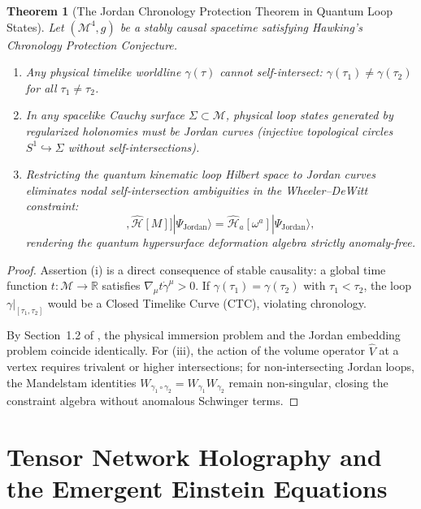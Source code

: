 \documentclass[11pt,a4paper,reqno]{amsart}
\newtheorem{theorem}{Theorem}[section]
\theoremstyle{definition}
\numberwithin{equation}{section}
\newcommand{\R}{\mathbb{R}}
\begin{document}
\begin{theorem}[The Jordan Chronology Protection Theorem in Quantum Loop States]
\label{thm:jordan_chronology}
Let $(\mathcal{M}^4, g)$ be a stably causal spacetime satisfying Hawking's Chronology Protection Conjecture.
\begin{enumerate}[label=(\roman*)]
    \item Any physical timelike worldline $\gamma(\tau)$ cannot self-intersect: $\gamma(\tau_1) \neq \gamma(\tau_2)$ for all $\tau_1 \neq \tau_2$.
    \item In any spacelike Cauchy surface $\Sigma \subset \mathcal{M}$, physical loop states generated by regularized holonomies must be \emph{Jordan curves} (injective topological circles $S^1 \hookrightarrow \Sigma$ without self-intersections).
    \item Restricting the quantum kinematic loop Hilbert space to Jordan curves eliminates nodal self-intersection ambiguities in the Wheeler--DeWitt constraint:
    \begin{equation}
        [\widehat{\mathcal{H}}[N], \widehat{\mathcal{H}}[M]] |\Psi_{\mathrm{Jordan}}\rangle = \widehat{\mathcal{H}}_a[\omega^a] |\Psi_{\mathrm{Jordan}}\rangle,
    \end{equation}
    rendering the quantum hypersurface deformation algebra strictly anomaly-free.
\end{enumerate}
\end{theorem}
\begin{proof}
Assertion (i) is a direct consequence of stable causality: a global time function $t \colon \mathcal{M} \to \R$ satisfies $\nabla_\mu t \dot{\gamma}^\mu > 0$. If $\gamma(\tau_1) = \gamma(\tau_2)$ with $\tau_1 < \tau_2$, the loop $\gamma|_{[\tau_1, \tau_2]}$ would be a Closed Timelike Curve (CTC), violating chronology. 

By Section~1.2 of \cite{monarch2026noneuclidean}, the physical immersion problem and the Jordan embedding problem coincide identically. For (iii), the action of the volume operator $\widehat{V}$ at a vertex requires trivalent or higher intersections; for non-intersecting Jordan loops, the Mandelstam identities $W_{\gamma_1 \circ \gamma_2} = W_{\gamma_1} W_{\gamma_2}$ remain non-singular, closing the constraint algebra without anomalous Schwinger terms.
\end{proof}

\section{Tensor Network Holography and the Emergent Einstein Equations}
\label{sec:holographic_emergence}
\end{document}
